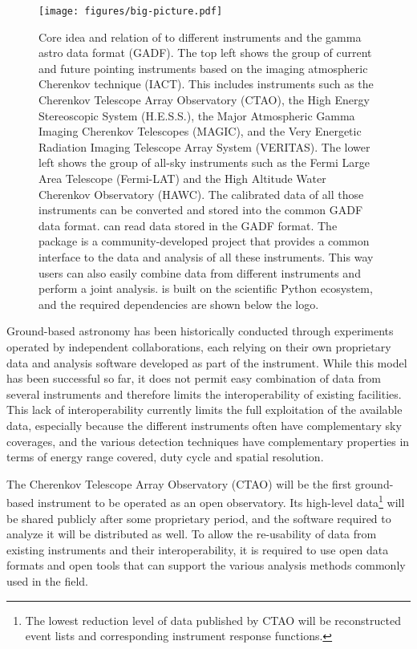 \documentclass[longauth]{aa}
\begin{document}
\begin{figure*}[t]
	\centering
	\texttt{[image: figures/big-picture.pdf]}
	\caption{
		Core idea and relation of \gammapy to different \gammaray instruments
		and the gamma astro data format (GADF). The top left shows the
		group of current and future pointing instruments based on the 
		imaging atmospheric Cherenkov technique (IACT). This includes
		instruments such as the Cherenkov Telescope Array Observatory (CTAO),
		the High Energy Stereoscopic System (H.E.S.S.), the
		Major Atmospheric Gamma Imaging Cherenkov Telescopes (MAGIC),
		and the Very Energetic Radiation Imaging Telescope Array System (VERITAS).
		The lower left shows the group of all-sky instruments such as the
		Fermi Large Area Telescope (Fermi-LAT) and the High Altitude
		Water Cherenkov Observatory (HAWC). The calibrated data of all those
		instruments can be converted and stored into the common GADF data format.
		\gammapy can read data stored in the GADF format.
		The \gammapy package is a community-developed project that
		provides a common interface to the data and analysis of all
		these \gammaray instruments. This way users can also easily combine data from
		different instruments and perform a joint analysis.
		\gammapy is built on the scientific Python ecosystem, and the required dependencies
		are shown below the \gammapy logo.
	}
	\label{fig:big_picture}

\end{figure*}


Ground-based \gammaray astronomy has been historically conducted
through experiments operated by independent collaborations, each relying
on their own proprietary data and analysis software developed as part of the
instrument. While this model has been successful so far, it does not
permit easy combination of data from several instruments and therefore
limits the interoperability of existing facilities. This lack of
interoperability currently limits the full exploitation of the
available \gammaray data, especially because the different instruments often have
complementary sky coverages, and the various detection
techniques have complementary properties in terms of energy range covered,
duty cycle and spatial resolution.

The Cherenkov Telescope Array Observatory (CTAO) will be the first ground-based \gammaray instrument to be operated as an open observatory.
Its high-level data\footnote{The lowest reduction level of data published by CTAO will be reconstructed event lists and corresponding instrument response functions.} will be shared publicly after
some proprietary period, and the software required to analyze it will be distributed
as well. To allow the re-usability of data from existing instruments and their interoperability,
it is required to use open data formats and open tools that can support the various analysis methods
commonly used in the field.
\end{document}
